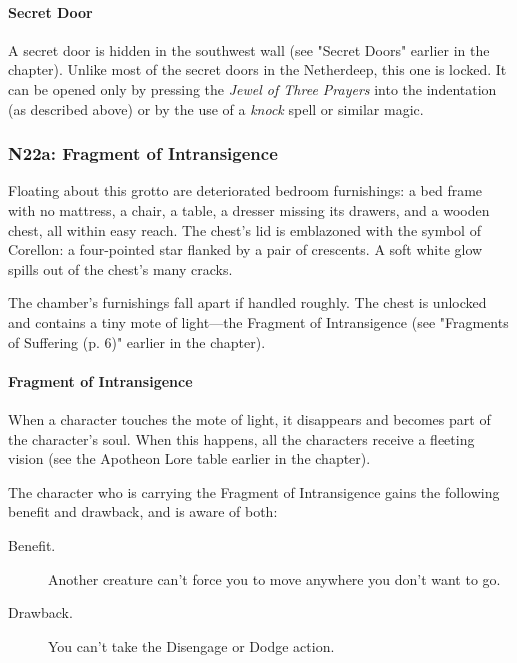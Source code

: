 \documentclass[a4paper, 11pt, bg=full, twocolumn, nooutline]{dndbook}
\begin{document}
\paragraph{Secret Door}

A secret door is hidden in the southwest wall (see "Secret Doors" earlier in the chapter). Unlike most of the secret doors in the Netherdeep, this one is locked. It can be opened only by pressing the \textit{Jewel of Three Prayers} into the indentation (as described above) or by the use of a \textit{knock} spell or similar magic.

\subsubsection{N22a: Fragment of Intransigence}

\begin{DndReadAloud}
Floating about this grotto are deteriorated bedroom furnishings: a bed frame with no mattress, a chair, a table, a dresser missing its drawers, and a wooden chest, all within easy reach. The chest's lid is emblazoned with the symbol of Corellon: a four-pointed star flanked by a pair of crescents. A soft white glow spills out of the chest's many cracks.
\end{DndReadAloud}

The chamber's furnishings fall apart if handled roughly. The chest is unlocked and contains a tiny mote of light---the Fragment of Intransigence (see "Fragments of Suffering (p. 6)" earlier in the chapter).

\paragraph{Fragment of Intransigence}

When a character touches the mote of light, it disappears and becomes part of the character's soul. When this happens, all the characters receive a fleeting vision (see the Apotheon Lore table earlier in the chapter).

The character who is carrying the Fragment of Intransigence gains the following benefit and drawback, and is aware of both:

\begin{DndSidebar}{}
\begin{description}
\item[Benefit.] Another creature can't force you to move anywhere you don't want to go.
\item[Drawback.] You can't take the Disengage or Dodge action.
\end{description}
\end{DndSidebar}
\end{document}
